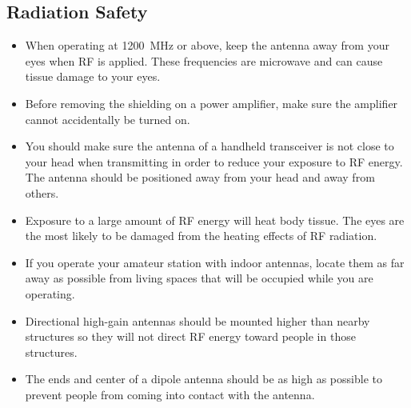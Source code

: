 \documentclass[letterpaper,12pt]{scrartcl}
\begin{document}
\subsection{Radiation Safety}

\begin{itemize}
\item When operating at 1200~MHz or above, keep the antenna away from your eyes when RF is applied. These frequencies are microwave and can cause tissue damage to your eyes.
\item Before removing the shielding on a power amplifier, make sure the amplifier cannot accidentally be turned on.
\item You should make sure the antenna of a handheld transceiver is not close to your head when transmitting in order to reduce your exposure to RF energy.
The antenna should be positioned away from your head and away from others.
\item Exposure to a large amount of RF energy will heat body tissue. The eyes are the most likely to be damaged from the heating effects of RF radiation.
\item If you operate your amateur station with indoor antennas, locate them as far away as possible from living spaces that will be occupied while you are operating.
\item Directional high-gain antennas should be mounted higher than nearby structures so they will not direct
RF energy toward people in those structures.
\item The ends and center of a dipole antenna should be as high as possible to prevent people from coming into contact with the antenna.
\end{itemize}
\end{document}
